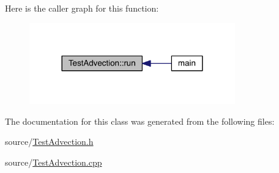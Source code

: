 Here is the caller graph for this function\+:\nopagebreak
\begin{figure}[H]
\begin{center}
\leavevmode
\includegraphics[width=252pt]{d1/d76/class_test_advection_a06ea2c54a664b65b02259ba2c0c4ff38_icgraph}
\end{center}
\end{figure}




The documentation for this class was generated from the following files\+:\begin{DoxyCompactItemize}
\item 
source/\hyperlink{_test_advection_8h}{Test\+Advection.\+h}\item 
source/\hyperlink{_test_advection_8cpp}{Test\+Advection.\+cpp}\end{DoxyCompactItemize}
